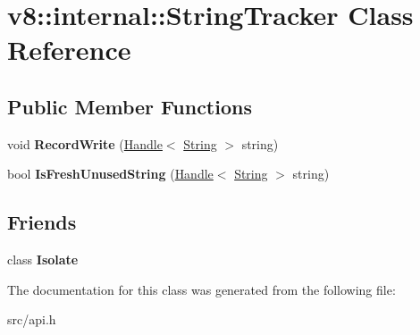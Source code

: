 \hypertarget{classv8_1_1internal_1_1_string_tracker}{}\section{v8\+:\+:internal\+:\+:String\+Tracker Class Reference}
\label{classv8_1_1internal_1_1_string_tracker}
\subsection*{Public Member Functions}
\begin{DoxyCompactItemize}
\item 
\hypertarget{classv8_1_1internal_1_1_string_tracker_a28553acd7bdc98ac9eb86d7656ef71a4}{}void {\bfseries Record\+Write} (\hyperlink{classv8_1_1internal_1_1_handle}{Handle}$<$ \hyperlink{classv8_1_1internal_1_1_string}{String} $>$ string)\label{classv8_1_1internal_1_1_string_tracker_a28553acd7bdc98ac9eb86d7656ef71a4}

\item 
\hypertarget{classv8_1_1internal_1_1_string_tracker_ae48a141d31c439f3f929d8c19c51887e}{}bool {\bfseries Is\+Fresh\+Unused\+String} (\hyperlink{classv8_1_1internal_1_1_handle}{Handle}$<$ \hyperlink{classv8_1_1internal_1_1_string}{String} $>$ string)\label{classv8_1_1internal_1_1_string_tracker_ae48a141d31c439f3f929d8c19c51887e}

\end{DoxyCompactItemize}
\subsection*{Friends}
\begin{DoxyCompactItemize}
\item 
\hypertarget{classv8_1_1internal_1_1_string_tracker_aba4f0964bdacf2bbf62cf876e5d28d0a}{}class {\bfseries Isolate}\label{classv8_1_1internal_1_1_string_tracker_aba4f0964bdacf2bbf62cf876e5d28d0a}

\end{DoxyCompactItemize}


The documentation for this class was generated from the following file\+:\begin{DoxyCompactItemize}
\item 
src/api.\+h\end{DoxyCompactItemize}
